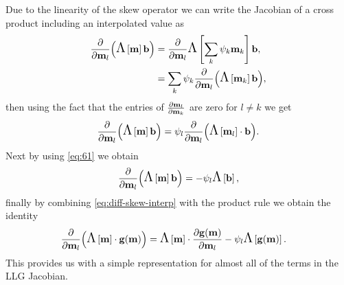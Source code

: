 Due to the linearity of the skew operator we can write the Jacobian of a cross product including an interpolated value as 
\begin{equation}
  \begin{aligned}
    \frac{\partial }{\partial \mathbf{m}_l} {\left( \text{\Large{$\Lambda$}}\left[ \mathbf{m} \right] {\mathbf{b}} \right)} &= \frac{\partial }{\partial \mathbf{m}_l} \text{\Large{$\Lambda$}}\left[ \sum_{k} {\psi_k} \mathbf{m}_{k} \right] {\mathbf{b}}, \\
    &= \sum_k \psi_k \frac{\partial }{\partial \mathbf{m}_l} {\left( \text{\Large{$\Lambda$}}\left[ \mathbf{m}_k \right] {\mathbf{b}} \right)},
  \end{aligned} 
\end{equation}
then using the fact that the entries of $\frac{\partial \mathbf{m}_{l}}{\partial \mathbf{m}_{k}}$ are zero for $l \neq k$ we get
\begin{equation}
  \frac{\partial }{\partial \mathbf{m}_l} {\left( \text{\Large{$\Lambda$}}\left[ \mathbf{m} \right] {\mathbf{b}} \right)}  = \psi_l \frac{\partial }{\partial \mathbf{m}_l} {\left( \text{\Large{$\Lambda$}}\left[ \mathbf{m}_l \right] \cdot {\mathbf{b}} \right)}.
\end{equation}
Next by using \cref{eq:61} we obtain
\begin{equation}
  \pd{}{\mv_l} \bigb{\skewm{\mv} \bv} = - \sbf_l\skewm{\bv},
  \label{eq:diff-skew-interp}
\end{equation}
finally by combining \cref{eq:diff-skew-interp} with the product rule we obtain the identity
\begin{equation}
  \begin{aligned}
    \pd{}{\mv_l} \bigb{\skewm{\mv}\cdot \gv(\mv)} 
    &= \skewm{\mv}\cdot \pd{\gv(\mv)}{\mv_l} - \sbf_l \skewm{\gv(\mv)}.
    \label{eq:68}
  \end{aligned}
\end{equation}
This provides us with a simple representation for almost all of the terms in the LLG Jacobian.



